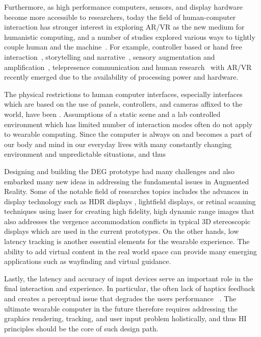 Furthermore, as high performance computers, sensors, and display hardware become more accessible to researchers, today the field of human-computer interaction has stronger interest in exploring AR/VR as the new medium for humanistic computing, and a number of studies explored various ways to tightly couple human and the machine~\cite{khundam2015first, biocca2013communication, wright2014using, henrikson2016multi}. For example, controller based or hand free interaction~\cite{Arora:vrSketching:2017}, storytelling and narrative~\cite{henrikson2016multi}, sensory augmentation and amplification~\cite{wright2014using}, telepresence communication and human research~\cite{biocca2013communication,earnshaw2014virtual} with AR/VR recently emerged due to the availability of processing power and hardware.

The physical restrictions to human computer interfaces, especially interfaces which are based on the use of panels, controllers, and cameras affixed to the world, have been . Assumptions of a static scene and a lab controlled environment which has limited number of interaction modes often do not apply to wearable computing. Since the computer is always on and becomes a part of our body and mind in our everyday lives with many constantly changing environment and unpredictable situations, and thus 

Designing and building the DEG prototype had many challenges and also embarked many new ideas in addressing the fundamental issues in Augmented Reality. Some of the notable field of researches topics includes the advances in display technology such as HDR displays \cite{reinhard2010high}, lightfield displays\cite{wetzstein2011layered}, or retinal scanning techniques using laser for creating high fidelity, high dynamic range images that also addresses the vergence accommodation conflicts \cite{takahashi2008stereoscopic} in typical 3D stereoscopic displays which are used in the current prototypes. On the other hands, low latency tracking is another essential elements for the wearable experience. The ability to add virtual content in the real world space can provide many emerging applications such as wayfinding and virtual guidance. 

Lastly, the latency and accuracy of input devices serve an important role in the final interaction and experience. In particular, the often lack of haptics feedback and creates a perceptual issue that degrades the users performance \cite{yang2016perceptual}~\cite{buchmann2004fingartips}. The ultimate wearable computer in the future therefore requires addressing the graphics rendering, tracking, and user input problem holistically, and thus HI principles should be the core of such design path.

